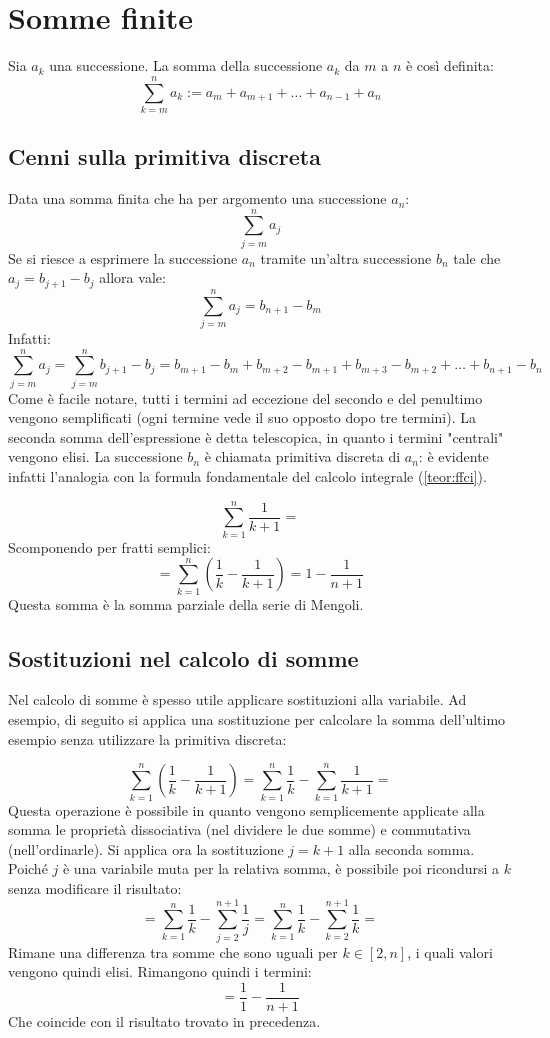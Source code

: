 \section{Somme finite}
\begin{defin}
	Sia $a_k$ una successione. La somma della successione $a_k$ da $m$ a $n$ è così definita:
	\[
		\sum_{k=m}^n a_k:= a_m+a_{m+1}+\dots+a_{n-1}+a_n
	\]
\end{defin}


\subsection{Cenni sulla primitiva discreta}
\label{sum:tele}
Data una somma finita che ha per argomento una successione $a_n$:
\[
	\sum_{j=m}^n a_j
\]
Se si riesce a esprimere la successione $a_n$ tramite un'altra successione $b_n$ tale che $a_j=b_{j+1}-b_j$ allora vale:
\[
	\sum_{j=m}^n a_j=b_{n+1}-b_m
\]
Infatti:
\[
	\sum_{j=m}^n a_j=\sum_{j=m}^n b_{j+1}-b_j=b_{m+1}-b_m+b_{m+2}-b_{m+1}+b_{m+3}-b_{m+2}+\dots+b_{n+1}-b_n
\]
Come è facile notare, tutti i termini ad eccezione del secondo e del penultimo vengono semplificati (ogni termine vede il suo opposto dopo tre termini). La seconda somma dell'espressione è detta telescopica, in quanto i termini "centrali" vengono elisi. La successione $b_n$ è chiamata primitiva discreta di $a_n$: è evidente infatti l'analogia con la formula fondamentale del calcolo integrale (\vref{teor:ffci}).

\begin{examp}
	\[
		\sum_{k=1}^n\frac{1}{k+1}=
	\]
	Scomponendo per fratti semplici:
	\[
		=\sum_{k=1}^n\left(\frac{1}{k}-\frac{1}{k+1}\right)=1-\frac{1}{n+1}
	\]
	Questa somma è la somma parziale della serie di Mengoli.
\end{examp}


\subsection{Sostituzioni nel calcolo di somme}
Nel calcolo di somme è spesso utile applicare sostituzioni alla variabile. Ad esempio, di seguito si applica una sostituzione per calcolare la somma dell'ultimo esempio senza utilizzare la primitiva discreta:
\begin{examp}
	\[
		\sum_{k=1}^n\left(\frac{1}{k}-\frac{1}{k+1}\right)=\sum_{k=1}^n\frac{1}{k}-\sum_{k=1}^n\frac{1}{k+1}=
	\]
	Questa operazione è possibile in quanto vengono semplicemente applicate alla somma le proprietà dissociativa (nel dividere le due somme) e commutativa (nell'ordinarle). Si applica ora la sostituzione $j=k+1$ alla seconda somma. Poiché $j$ è una variabile muta per la relativa somma, è possibile poi ricondursi a $k$ senza modificare il risultato:
	\[
		=\sum_{k=1}^n\frac{1}{k}-\sum_{j=2}^{n+1}\frac{1}{j}=\sum_{k=1}^n\frac{1}{k}-\sum_{k=2}^{n+1}\frac{1}{k}=
	\]
	Rimane una differenza tra somme che sono uguali per $k\in[2,n]$, i quali valori vengono quindi elisi. Rimangono quindi i termini:
	\[
		=\frac{1}{1}-\frac{1}{n+1}
	\]
	Che coincide con il risultato trovato in precedenza.
\end{examp}

